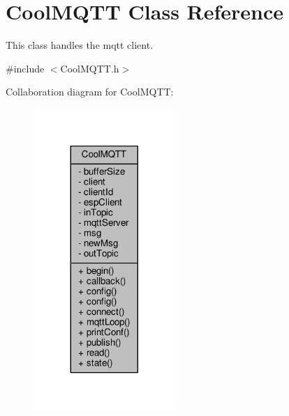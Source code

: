 \hypertarget{classCoolMQTT}{}\section{Cool\+M\+Q\+TT Class Reference}
\label{classCoolMQTT}


This class handles the mqtt client.  




{\ttfamily \#include $<$Cool\+M\+Q\+T\+T.\+h$>$}



Collaboration diagram for Cool\+M\+Q\+TT\+:
\nopagebreak
\begin{figure}[H]
\begin{center}
\leavevmode
\includegraphics[width=152pt]{classCoolMQTT__coll__graph}
\end{center}
\end{figure}
